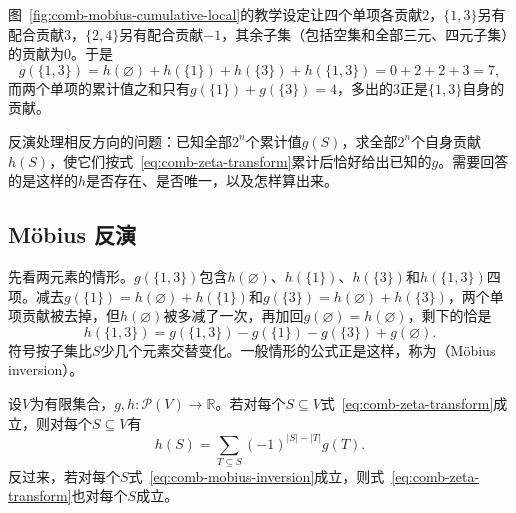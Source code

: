 图~\ref{fig:comb-mobius-cumulative-local}的教学设定让四个单项各贡献$2$，$\{1,3\}$另有配合贡献$3$，$\{2,4\}$另有配合贡献$-1$，其余子集（包括空集和全部三元、四元子集）的贡献为$0$。于是
\[
  g(\{1,3\})=h(\varnothing)+h(\{1\})+h(\{3\})+h(\{1,3\})=0+2+2+3=7,
\]
而两个单项的累计值之和只有$g(\{1\})+g(\{3\})=4$，多出的$3$正是$\{1,3\}$自身的贡献。

反演处理相反方向的问题：已知全部$2^n$个累计值$g(S)$，求全部$2^n$个自身贡献$h(S)$，使它们按式~\eqref{eq:comb-zeta-transform}累计后恰好给出已知的$g$。需要回答的是这样的$h$是否存在、是否唯一，以及怎样算出来。

\subsection{Möbius 反演}
\label{sec:graph-setfn-mobius-inversion}

先看两元素的情形。$g(\{1,3\})$包含$h(\varnothing)$、$h(\{1\})$、$h(\{3\})$和$h(\{1,3\})$四项。减去$g(\{1\})=h(\varnothing)+h(\{1\})$和$g(\{3\})=h(\varnothing)+h(\{3\})$，两个单项贡献被去掉，但$h(\varnothing)$被多减了一次，再加回$g(\varnothing)=h(\varnothing)$，剩下的恰是
\[
  h(\{1,3\})=g(\{1,3\})-g(\{1\})-g(\{3\})+g(\varnothing).
\]
符号按子集比$S$少几个元素交替变化。一般情形的公式正是这样，称为（Möbius inversion）。

\begin{theorem}
\label{thm:comb-mobius-inversion}
设$V$为有限集合，$g,h:\mathcal P(V)\to\mathbb R$。若对每个$S\subseteq V$式~\eqref{eq:comb-zeta-transform}成立，则对每个$S\subseteq V$有
\begin{equation}
  h(S)=\sum_{T\subseteq S}(-1)^{|S|-|T|}g(T).
  \label{eq:comb-mobius-inversion}
\end{equation}
反过来，若对每个$S$式~\eqref{eq:comb-mobius-inversion}成立，则式~\eqref{eq:comb-zeta-transform}也对每个$S$成立。
\end{theorem}

